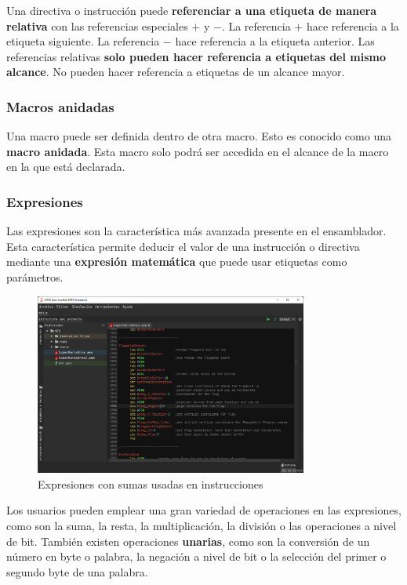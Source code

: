 Una directiva o instrucción puede \textbf{referenciar a una etiqueta de manera
relativa} con las referencias especiales $+$ y $-$.
La referencia $+$ hace referencia a la etiqueta siguiente.
La referencia $-$ hace referencia a la etiqueta anterior.
Las referencias relativas \textbf{solo pueden hacer referencia
a etiquetas del mismo alcance}.
No pueden hacer referencia a etiquetas de un alcance mayor.

\subsubsection{Macros anidadas}\label{subsubsec:macros-anidadas}

Una macro puede ser definida dentro de otra macro.
Esto es conocido como una \textbf{macro anidada}.
Esta macro solo podrá ser accedida en el alcance de la macro
en la que está declarada.

\subsubsection{Expresiones}\label{subsubsec:expresiones}

Las expresiones son la característica más avanzada
presente en el ensamblador.
Esta característica permite deducir el valor
de una instrucción o directiva mediante una \textbf{expresión matemática}
que puede usar etiquetas como parámetros.

\begin{figure}[h]
    \centering
    \includegraphics[width=0.8\textwidth]{images/nes/nes-expressions}
    \caption{Expresiones con sumas usadas en instrucciones}
    \label{fig:nes-expressions}
\end{figure}

Los usuarios pueden emplear una gran variedad de operaciones
en las expresiones, como son la suma, la resta, la multiplicación,
la división o las operaciones a nivel de bit.
También existen operaciones \textbf{unarias}, como son
la conversión de un número en byte o palabra,
la negación a nivel de bit o la selección del
primer o segundo byte de una palabra.

